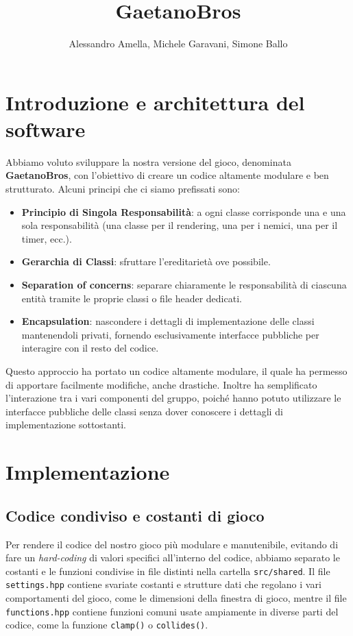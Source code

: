 \documentclass[a4paper,12pt]{article}
\title{\textbf{GaetanoBros}}
\author{Alessandro Amella, Michele Garavani, Simone Ballo}
\date{\formatdate{2}{9}{2023}}
\begin{document}
\maketitle

\section{Introduzione e architettura del software}
Abbiamo voluto sviluppare la nostra versione del gioco, denominata \textbf{GaetanoBros}, con l'obiettivo di creare un codice altamente modulare e ben strutturato. Alcuni principi che ci siamo prefissati sono:
\begin{itemize}
\item \textbf{Principio di Singola Responsabilità}: a ogni classe corrisponde una e una sola responsabilità (una classe per il rendering, una per i nemici, una per il timer, ecc.).
\item \textbf{Gerarchia di Classi}: sfruttare l'ereditarietà ove possibile.
\item \textbf{Separation of concerns}: separare chiaramente le responsabilità di ciascuna entità tramite le proprie classi o file header dedicati.
\item \textbf{Encapsulation}: nascondere i dettagli di implementazione delle classi mantenendoli privati, fornendo esclusivamente interfacce pubbliche per interagire con il resto del codice.
\end{itemize}

Questo approccio ha portato un codice altamente modulare, il quale ha permesso di apportare facilmente modifiche, anche drastiche. Inoltre ha semplificato l'interazione tra i vari componenti del gruppo, poiché hanno potuto utilizzare le interfacce pubbliche delle classi senza dover conoscere i dettagli di implementazione sottostanti.


\section{Implementazione}
\subsection{Codice condiviso e costanti di gioco}
Per rendere il codice del nostro gioco più modulare e manutenibile, evitando di fare un \textit{hard-coding} di valori specifici all'interno del codice, abbiamo separato le costanti e le funzioni condivise in file distinti nella cartella \texttt{src/shared}. Il file \texttt{settings.hpp} contiene svariate costanti e strutture dati che regolano i vari comportamenti del gioco, come le dimensioni della finestra di gioco, mentre il file \texttt{functions.hpp} contiene funzioni comuni usate ampiamente in diverse parti del codice, come la funzione \texttt{clamp()} o \texttt{collides()}.
\end{document}
